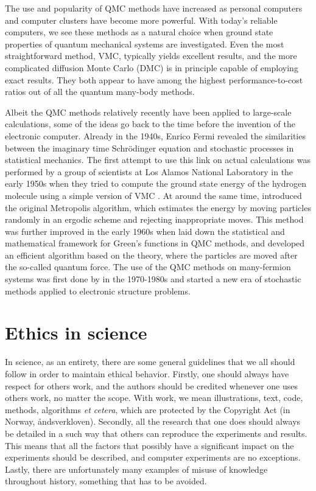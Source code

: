 The use and popularity of QMC methods have increased as personal computers and computer clusters have become more powerful. With today's reliable computers, we see these methods as a natural choice when ground state properties of quantum mechanical systems are investigated. Even the most straightforward method, VMC, typically yields excellent results, and the more complicated diffusion Monte Carlo (DMC) is in principle capable of employing exact results. They both appear to have among the highest performance-to-cost ratios out of all the quantum many-body methods. 

Albeit the QMC methods relatively recently have been applied to large-scale calculations, some of the ideas go back to the time before the invention of the electronic computer. Already in the 1940s, Enrico Fermi revealed the similarities between the imaginary time Schrödinger equation and stochastic processes in statistical mechanics\supercite{metropolis_monte_1949,ceperley_quantum_1986}. The first attempt to use this link on actual calculations was performed by a group of scientists at Los Alamos National Laboratory in the early 1950s when they tried to compute the ground state energy of the hydrogen molecule using a simple version of VMC \supercite{bajdich_electronic_2010}. At around the same time, \citet{metropolis_monte_1949} introduced the original Metropolis algorithm, which estimates the energy by moving particles randomly in an ergodic scheme and rejecting inappropriate moves. This method was further improved in the early 1960s when \citet{kalos} laid down the statistical and mathematical framework for Green's functions in QMC methods, and \citet{hastings_monte_1970} developed an efficient algorithm based on the theory, where the particles are moved after the so-called quantum force. The use of the QMC methods on many-fermion systems was first done by \citet{ceperley_quantum_1986} in the 1970-1980s and started a new era of stochastic methods applied to electronic structure problems. 

\section{Ethics in science}
In science, as an entirety, there are some general guidelines that we all should follow in order to maintain ethical behavior. Firstly, one should always have respect for others work, and the authors should be credited whenever one uses others work, no matter the scope. With work, we mean illustrations, text, code, methods, algorithms \textit{et cetera}, which are protected by the Copyright Act (in Norway, åndsverkloven). Secondly, all the research that one does should always be detailed in a such way that others can reproduce the experiments and results. This means that all the factors that possibly have a significant impact on the experiments should be described, and computer experiments are no exceptions. Lastly, there are unfortunately many examples of misuse of knowledge throughout history, something that has to be avoided.

